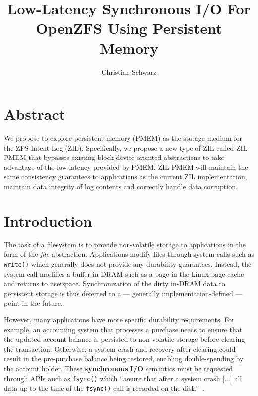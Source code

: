 \documentclass[12pt,a4paper,twoside]{book}
\begin{document}
\frontmatter
{}

\title{Low-Latency Synchronous I/O For OpenZFS Using Persistent Memory}
\author{Christian Schwarz}
\maketitle



\chapter{Abstract}
We propose to explore persistent memory (PMEM) as the storage medium for the ZFS Intent Log (ZIL). Specifically, we propose a new type of ZIL called ZIL-PMEM that bypasses existing block-device oriented abstractions to take advantage of the low latency provided by PMEM. ZIL-PMEM will maintain the same consistency guarantees to applications as the current ZIL implementation, maintain data integrity of log contents and correctly handle data corruption.

\blindtext

\mainmatter
\cleardoublepage
{}
{}
\tableofcontents

\chapter{Introduction}
The task of a filesystem is to provide non-volatile storage to applications in the form of the \textit{file} abstraction.
Applications modify files through system calls such as \lstinline{write()} which generally does not provide any durability guarantees.
Instead, the system call modifies a buffer in DRAM such as a page in the Linux page cache and returns to userspace.
Synchronization of the dirty in-DRAM data to persistent storage is thus deferred to a --- generally implementation-defined --- point in the future.

However, many applications have more specific durability requirements.
For example, an accounting system that processes a purchase needs to ensure that the updated account balance is persisted to non-volatile storage before clearing the transaction.
Otherwise, a system crash and recovery after clearing could result in the pre-purchase balance being restored, enabling double-spending by the account holder.
These \textbf{synchronous I/O} semantics must be requested through APIs auch as \lstinline{fsync()} which ``assure that after a system crash [...] all data up to the time of the \lstinline{fsync()} call is recorded on the disk.''~\cite{posix_fsync_opengroup}.
\end{document}
